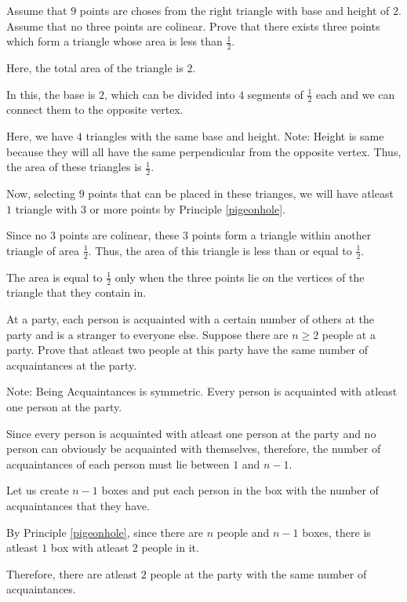 \begin{problem}
	Assume that $9$ points are choses from the right triangle with base and height of $2$. Assume that no three points are colinear. Prove that there exists three points which form a triangle whose area is less than $\frac{1}{2}$.
\end{problem}

\begin{solution}
	Here, the total area of the triangle is $2$.
	
	In this, the base is $2$, which can be divided into $4$ segments of $\frac{1}{2}$ each and we can connect them to the opposite vertex.

	Here, we have $4$ triangles with the same base and height. Note: Height is same because they will all have the same perpendicular from the opposite vertex.
	Thus, the area of these triangles is $\frac{1}{2}$.

	Now, selecting $9$ points that can be placed in these trianges, we will have atleast $1$ triangle with $3$ or more points by Principle \ref{pigeonhole}. 

	Since no $3$ points are colinear, these $3$ points form a triangle within another triangle of area $\frac{1}{2}$. Thus, the area of this triangle is less than or equal to $\frac{1}{2}$.

	The area is equal to $\frac{1}{2}$ only when the three points lie on the vertices of the triangle that they contain in.

\end{solution}


\begin{problem}
	At a party, each person is acquainted with a certain number of others at the party and is a stranger to everyone else. Suppose there are $n \geq 2$ people at a party. Prove that atleast two people at this party have the same number of acquaintances at the party.

	Note: Being Acquaintances is symmetric. Every person is acquainted with atleast one person at the party.
\end{problem}

\begin{solution}
Since every person is acquainted with atleast one person at the party and no person can obviously be acquainted with themselves, therefore, the number of acquaintances of each person must lie between $1$ and $n-1$.

Let us create $n-1$ boxes and put each person in the box with the number of acquaintances that they have.

By Principle \ref{pigeonhole}, since there are $n$ people and $n-1$ boxes, there is atleast $1$ box with atleast $2$ people in it.

Therefore, there are atleast $2$ people at the party with the same number of acquaintances.
\end{solution}

